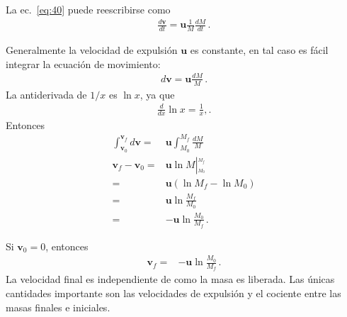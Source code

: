 La ec.~\eqref{eq:40} puede reescribirse como
\begin{align}
  \label{eq:m41}
  \frac{d\mathbf{v}}{dt}=\mathbf{u}\frac{1}{M}\frac{dM}{dt}\,.
\end{align}


Generalmente la velocidad de expulsión $\mathbf{u}$ es constante, en tal caso es fácil integrar la ecuación de movimiento:
\begin{align}
{d\mathbf{v}}=\mathbf{u}\frac{dM}{M}\,.
\end{align}
La antiderivada de $1/x$ es $\ln x$, ya que
\begin{align}
  \frac{d}{dx}\ln x=\frac{1}{x},.
\end{align}
Entonces
\begin{align}
  \int_{\mathbf{v}_0}^{\mathbf{v}_f}{d\mathbf{v}}=&\mathbf{u}\int_{M_0}^{M_f}\frac{dM}{M}\nonumber\\
\mathbf{v}_f-\mathbf{v}_0=&\mathbf{u}\ln M\left|_{{}_{M_0}}^{{}^{M_f}}\right.\nonumber\\
=&\mathbf{u}\left(\ln M_f-\ln M_0\right)\nonumber\\
=&\mathbf{u}\ln\frac{M_f}{M_0}\nonumber\\
=&-\mathbf{u}\ln\frac{M_0}{M_f}\,.
\end{align}

Si $\mathbf{v}_0=0$, entonces
\begin{align}
  \mathbf{v}_f=&-\mathbf{u}\ln\frac{M_0}{M_f}\,.
\end{align}
La velocidad final es independiente de como la masa es liberada. Las únicas cantidades importante son las velocidades de expulsión y el cociente entre las masas finales e iniciales.

